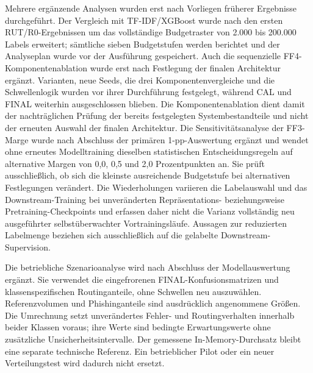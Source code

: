 Mehrere ergänzende Analysen wurden erst nach Vorliegen früherer Ergebnisse durchgeführt.
Der Vergleich mit TF-IDF/XGBoost wurde nach den ersten RUT/R0-Ergebnissen um das
vollständige Budgetraster von 2.000 bis 200.000 Labels erweitert; sämtliche sieben
Budgetstufen werden berichtet und der Analyseplan wurde vor der Ausführung gespeichert.
Auch die sequenzielle FF4-Komponentenablation wurde erst nach Festlegung der finalen
Architektur ergänzt. Varianten, neue Seeds, die drei Komponentenvergleiche und die
Schwellenlogik wurden vor ihrer Durchführung festgelegt, während CAL und FINAL weiterhin
ausgeschlossen blieben. Die Komponentenablation dient damit der nachträglichen Prüfung der
bereits festgelegten Systembestandteile und nicht der erneuten Auswahl der finalen Architektur. Die Sensitivitätsanalyse der FF3-Marge wurde nach Abschluss der primären 1-pp-Auswertung
ergänzt und wendet ohne erneutes Modelltraining dieselben statistischen Entscheidungsregeln
auf alternative Margen von 0,0, 0,5 und 2,0 Prozentpunkten an. Sie prüft ausschließlich, ob
sich die kleinste ausreichende Budgetstufe bei alternativen Festlegungen verändert. Die
Wiederholungen variieren die Labelauswahl und das Downstream-Training bei unveränderten
Repräsentations- beziehungsweise Pretraining-Checkpoints und erfassen daher nicht die Varianz
vollständig neu ausgeführter selbstüberwachter Vortrainingsläufe. Aussagen zur reduzierten
Labelmenge beziehen sich ausschließlich auf die gelabelte Downstream-Supervision.


Die betriebliche Szenarioanalyse wird nach Abschluss der Modellauswertung ergänzt. Sie
verwendet die eingefrorenen FINAL-Konfusionsmatrizen und klassenspezifischen Routinganteile,
ohne Schwellen neu auszuwählen. Referenzvolumen und Phishinganteile sind ausdrücklich
angenommene Größen. Die Umrechnung setzt unverändertes Fehler- und Routingverhalten
innerhalb beider Klassen voraus; ihre Werte sind bedingte Erwartungswerte ohne zusätzliche
Unsicherheitsintervalle. Der gemessene In-Memory-Durchsatz bleibt eine separate technische
Referenz. Ein betrieblicher Pilot oder ein neuer Verteilungstest wird dadurch nicht ersetzt.

\lstset{
  basicstyle=\ttfamily\small,
  numbers=left,
  numberstyle=\tiny,
  stepnumber=2,
  numbersep=6pt,
  frame=single,
  framerule=0.3pt,
  breaklines=true,
  breakatwhitespace=false,
  breakindent=1.0em,
  columns=fullflexible,
  keepspaces=true,
  showstringspaces=false,
  xleftmargin=2.4em,
  xrightmargin=0.5em,
  aboveskip=0.30\baselineskip,
  belowskip=0.30\baselineskip,
  captionpos=b
}

